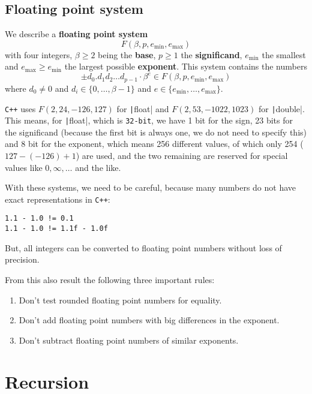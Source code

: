 \documentclass[fontsize=9pt, paper=landscape]{scrartcl}
\begin{document}
\begin{multicols}{2}
\subsection{Floating point system}

We describe a \textbf{floating point system} \[ F(\beta, p, e_{\min}, e_{\max}) \] with four integers, \( \beta \geq 2 \) being the \textbf{base}, \( p \geq 1 \) the \textbf{significand}, \( e_{\min} \) the smallest and \( e_{\max} \geq e_{\min} \) the largest possible \textbf{exponent}. This system contains the numbers \[ \pm d_0.d_1d_2 \dots d_{p-1} \cdot \beta^e \in F(\beta, p, e_{\min}, e_{\max}) \] where \( d_0 \neq 0 \) and \( d_i \in \{ 0, \dots, \beta-1 \} \) and \( e \in \{ e_{\min}, \dots, e_{\max} \} \).

\texttt{C++} uses \( F(2, 24, -126, 127) \) for \texttt|float| and \( F(2, 53, -1022, 1023) \) for \texttt|double|. This means, for \texttt|float|, which is \texttt{32-bit}, we have 1 bit for the sign, 23 bits for the significand (because the first bit is always one, we do not need to specify this) and 8 bit for the exponent, which means 256 different values, of which only 254 (\( 127-(-126)+1 \)) are used, and the two remaining are reserved for special values like \( 0, \infty, \dots \) and the like.

With these systems, we need to be careful, because many numbers do not have exact representations in \texttt{C++}:

\begin{verbatim}
1.1 - 1.0 != 0.1
1.1 - 1.0 != 1.1f - 1.0f
\end{verbatim}

But, all integers can be converted to floating point numbers without loss of precision.

From this also result the following three important rules:
\begin{enumerate}
	\item Don't test rounded floating point numbers for equality.
	\item Don't add floating point numbers with big differences in the exponent.
	\item Don't subtract floating point numbers of similar exponents.
\end{enumerate}

\section{Recursion}


\end{multicols}
\end{document}
